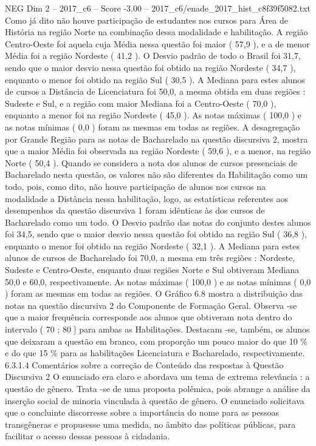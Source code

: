 \begin{textsample}{NEG Dim 2 – 2017\_c6 – Score -3.00 – 2017\_c6/enade\_2017\_hist\_c8f39f5082.txt}
Como já dito não houve participação de estudantes nos cursos para Área de História na região Norte na combinação dessa modalidade e habilitação.
A região Centro-Oeste foi aquela cuja Média nessa questão foi maior ( 57,9 ), e a de menor Média foi a região Nordeste ( 41,2 ).
O Desvio padrão de todo o Brasil foi 31,7, sendo que o maior desvio nessa questão foi obtido na região Nordeste ( 34,7 ), enquanto o menor foi obtido na região Sul ( 30,5 ).
A Mediana para estes alunos de cursos a Distância de Licenciatura foi 50,0, a mesma obtida em duas regiões : Sudeste e Sul, e a região com maior Mediana foi a Centro-Oeste ( 70,0 ), enquanto a menor foi na região Nordeste ( 45,0 ).
As notas máximas ( 100,0 ) e as notas mínimas ( 0,0 ) foram as mesmas em todas as regiões.
A desagregação por Grande Região para as notas de Bacharelado na questão discursiva 2, mostra que a maior Média foi observada na região Nordeste ( 59,6 ), e a menor, na região Norte ( 50,4 ).
Quando se considera a nota dos alunos de cursos presenciais de Bacharelado nesta questão, os valores não são diferentes da Habilitação como um todo, pois, como dito, não houve participação de alunos nos cursos na modalidade a Distância nessa habilitação, logo, as estatísticas referentes aos desempenhos da questão discursiva 1 foram idênticas às dos cursos de Bacharelado como um todo.
O Desvio padrão das notas do conjunto destes alunos foi 34,5, sendo que o maior desvio nessa questão foi obtido na região Sul ( 36,8 ), enquanto o menor foi obtido na região Nordeste ( 32,1 ).
A Mediana para estes alunos de cursos de Bacharelado foi 70,0, a mesma em três regiões : Nordeste, Sudeste e Centro-Oeste, enquanto duas regiões Norte e Sul obtiveram Mediana 50,0 e 60,0, respectivamente.
As notas máximas ( 100,0 ) e as notas mínimas ( 0,0 ) foram as mesmas em todas as regiões.
O Gráfico 6.8 mostra a distribuição das notas na questão discursiva 2 do Componente de Formação Geral.
Observa -se que a maior frequência corresponde aos alunos que obtiveram nota dentro do intervalo ( 70 ; 80 ] para ambas as Habilitações.
Destacam -se, também, os alunos que deixaram a questão em branco, com proporção um pouco maior do que 10 \% e do que 15 \% para as habilitações Licenciatura e Bacharelado, respectivamente. 6.3.1.4 Comentários sobre a correção de Conteúdo das respostas à Questão Discursiva 2 O enunciado era claro e abordava um tema de extrema relevância : a questão de gênero.
Trata -se de uma proposta polêmica, pois abrange a análise da inserção social de minoria vinculada à questão de gênero.
O enunciado solicitava que o concluinte discorresse sobre a importância do nome para as pessoas transgêneras e propusesse uma medida, no âmbito das políticas públicas, para facilitar o acesso dessas pessoas à cidadania.

\end{textsample}
